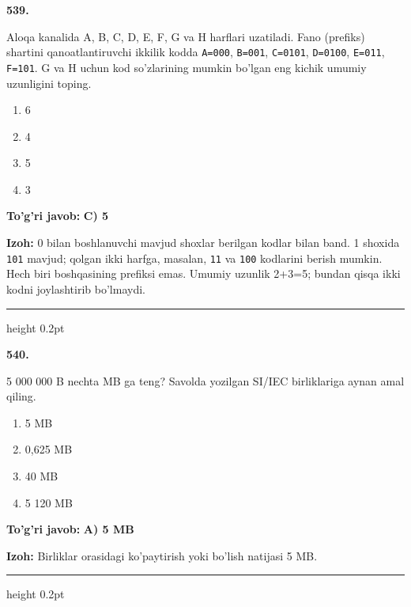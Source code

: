 \documentclass[10pt,a4paper,oneside]{article}
\begin{document}
\noindent\textbf{\color{ink}539.}
\par
Aloqa kanalida A, B, C, D, E, F, G va H harflari uzatiladi. Fano (prefiks) shartini qanoatlantiruvchi ikkilik kodda \texttt{A=000}, \texttt{B=001}, \texttt{C=0101}, \texttt{D=0100}, \texttt{E=011}, \texttt{F=101}. G va H uchun kod so'zlarining mumkin bo'lgan eng kichik umumiy uzunligini toping.
\begin{enumerate}[label=\Alph*),leftmargin=9mm]
\item 6
\item 4
\item 5
\item 3
\end{enumerate}
\begin{tcolorbox}[enhanced,breakable,colback=teal!4,colframe=teal!50!black,boxrule=0.5pt,arc=1.1mm,left=3mm,right=3mm,top=1.7mm,bottom=1.7mm,before skip=2mm,after skip=2mm]
\textbf{\color{teal}To'g'ri javob:} \textbf{C) 5}
\par\smallskip
\textbf{Izoh:} 0 bilan boshlanuvchi mavjud shoxlar berilgan kodlar bilan band. 1 shoxida \texttt{101} mavjud; qolgan ikki harfga, masalan, \texttt{11} va \texttt{100} kodlarini berish mumkin. Hech biri boshqasining prefiksi emas. Umumiy uzunlik 2+3=5; bundan qisqa ikki kodni joylashtirib bo'lmaydi.
\end{tcolorbox}
\vspace{2mm}\hrule height 0.2pt \vspace{3mm}

\noindent\textbf{\color{ink}540.}
\par
5 000 000 B nechta MB ga teng? Savolda yozilgan SI/IEC birliklariga aynan amal qiling.
\begin{enumerate}[label=\Alph*),leftmargin=9mm]
\item 5 MB
\item 0,625 MB
\item 40 MB
\item 5 120 MB
\end{enumerate}
\begin{tcolorbox}[enhanced,breakable,colback=teal!4,colframe=teal!50!black,boxrule=0.5pt,arc=1.1mm,left=3mm,right=3mm,top=1.7mm,bottom=1.7mm,before skip=2mm,after skip=2mm]
\textbf{\color{teal}To'g'ri javob:} \textbf{A) 5 MB}
\par\smallskip
\textbf{Izoh:} Birliklar orasidagi ko'paytirish yoki bo'lish natijasi 5 MB.
\end{tcolorbox}
\vspace{2mm}\hrule height 0.2pt \vspace{3mm}
\end{document}
